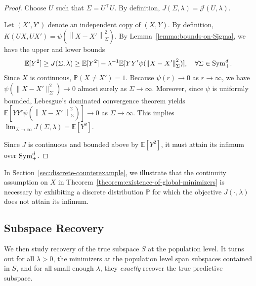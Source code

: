 \documentclass[sn-mathphys-num]{sn-jnl}%
\numberwithin{equation}{section}
\newcommand{\E}{\mathbb{E}}
\newcommand{\norm}[1]{\left\|{#1}\right\|} %
\renewcommand{\P}{\mathbb{P}}
\newcommand{\Sym}{{\rm \mathrm{Sym}}}
\theoremstyle{thmstyleone}%
\theoremstyle{thmstyletwo}%
\theoremstyle{thmstylethree}%
\begin{document}
\begin{proof} 
Choose $U$ such that $\Sigma = U^\top U$. By definition, $J(\Sigma,\lambda) = \mathcal{J}(U,\lambda)$. 

Let $(X', Y')$ denote an independent copy of $(X, Y)$. By definition, $K(UX, UX') = \psi(\norm{X-X'}_\Sigma^2)$. 
By Lemma~\ref{lemma:bounds-on-Sigma}, we have the upper and lower bounds
\begin{equation*}
	\E[Y^2] \ge J(\Sigma, \lambda) \ge \E[Y^2] - \lambda^{-1} \E[YY' \psi(\norm{X- X'}_\Sigma^2)],~~~\forall \Sigma \in \Sym_+^d.
\end{equation*}
Since $X$ is continuous, 
$\mathbb{P}(X \neq X') = 1$. Because $\psi(r) \to 0$ as $r \to \infty$, we have
$\psi(\|X - X'\|_\Sigma^2) \to 0$ almost surely as $\Sigma \to\infty$. 
Moreover, since $\psi$ is uniformly bounded, Lebesgue’s dominated convergence theorem yields
$\E[YY' \psi(\norm{X- X'}_\Sigma^2)] \to 0$ as $\Sigma \to \infty$. 
This implies $\lim_{\Sigma \to \infty} J(\Sigma, \lambda) = \E[Y^2]$.

Since $J$ is continuous and bounded above by $\E[Y^2]$, 
it must attain its infimum over $\Sym_+^d$.
\end{proof} 


In Section~\ref{sec:discrete-counterexample}, we illustrate that the continuity assumption on $X$ in
Theorem~\ref{theorem:existence-of-global-minimizers} is necessary by exhibiting
a discrete distribution $\P$ for which the objective $J(\cdot,\lambda)$ does not attain
its infimum.





\subsection{Subspace Recovery} 
\indent \indent
We then study recovery of the true subspace $S$ at the population level.
It turns out for all $\lambda > 0$, the minimizers at the population level span subspaces contained in $S$, 
and for all small enough $\lambda$, they \emph{exactly} recover the true predictive subspace.
 
\end{document}
